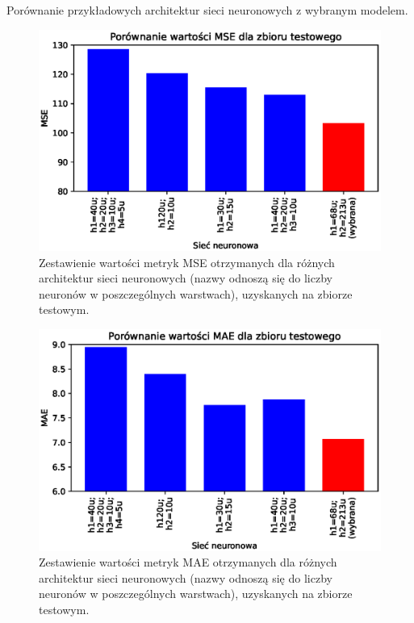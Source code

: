 \documentclass[a4paper,11pt]{article}
\begin{document}
    \bigskip

    Porównanie przykładowych architektur sieci neuronowych z wybranym modelem.

    \bigskip

    \begin{figure}[H]
        \label{fig:compr_mse}
        \centering
        \includegraphics[width=\textwidth]{compr_mse}
        \caption{Zestawienie wartości metryk MSE otrzymanych dla różnych architektur sieci neuronowych (nazwy odnoszą się do liczby neuronów w poszczególnych warstwach), uzyskanych na zbiorze testowym.}
    \end{figure}

    \bigskip

    \begin{figure}[H]
        \label{fig:compr_mae}
        \centering
        \includegraphics[width=\textwidth]{compr_mae}
        \caption{Zestawienie wartości metryk MAE otrzymanych dla różnych architektur sieci neuronowych (nazwy odnoszą się do liczby neuronów w poszczególnych warstwach), uzyskanych na zbiorze testowym.}
    \end{figure}
\end{document}
